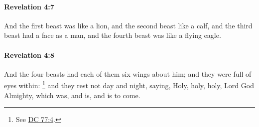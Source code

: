 		\paragraph{Revelation 4:7} %
			\label{REVELATIONNT-4-7}

			And the first beast was like a lion, and the second beast like a calf, and the third beast had a face as a man, and the fourth beast was like a flying eagle.

			\begin{framed}
			\scriptsize
				\begin{compactdesc}
					\item[SBLG] 
				\end{compactdesc}
			\end{framed}

		\paragraph{Revelation 4:8} %
			\label{REVELATIONNT-4-8}

			And the four beasts had each of them six wings about him; and they were full of eyes within:%
				\footnote{%
					See \hyperref[DC77-4]{DC 77:4}.
					} 
			and they rest not day and night, saying, Holy, holy, holy, Lord God Almighty, which was, and is, and is to come.

